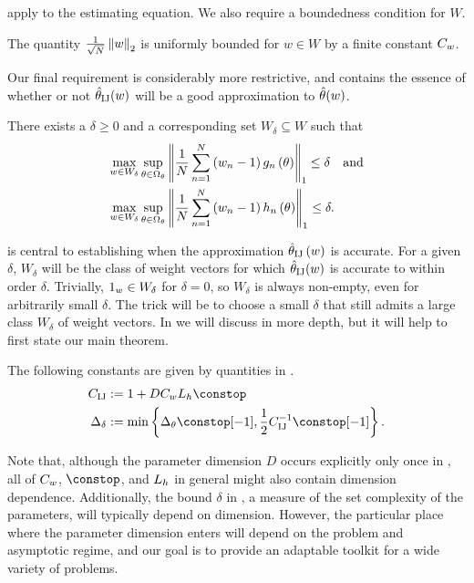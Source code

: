 \coreassum apply to the estimating equation.  We also require
a boundedness condition for $W$.
%
\begin{assumption} \label{assu:paper_weight_bounded}
The quantity
$\frac{1}{\sqrt{N}}\left\Vert w\right\Vert_{2}$ is uniformly bounded for $w\in W$ by a finite
constant $C_{w}$.
\end{assumption}
%
Our final requirement is considerably more restrictive, and
contains the essence of whether or not $\hat{\theta}_{\textrm{IJ}}(w)$ will be a good approximation
to $\hat{\theta}(w)$.
%
\begin{condition}
\label{cond:paper_uniform_bound}There exists a $\delta\ge0$ and
a corresponding set $W_{\delta}\subseteq W$ such that
%
\begin{align*}
\max_{w\in W_{\delta}}\sup_{
    \theta\in\Omega_{\theta}} &\left\Vert \frac{1}{N}\sum_{n=1}^{N}
    \left(w_{n}-1\right)g_{n}\left(\theta\right)\right\Vert_{1}  \le\delta
\quad\textrm{and} \\
\max_{w\in W_{\delta}}\sup_{
    \theta\in\Omega_{\theta}} &\left\Vert \frac{1}{N}\sum_{n=1}^{N}
    \left(w_{n}-1\right)h_{n}\left(\theta\right)\right\Vert_{1}  \le\delta.
\end{align*}
\end{condition}
%
 is central to establishing when the approximation
$\hat{\theta}_{\textrm{IJ}}\left(w\right)$ is accurate. For a given $\delta$, $W_{\delta}$ will be
the class of weight vectors for which $\hat{\theta}_{\textrm{IJ}}(w)$ is accurate to within order
$\delta$. Trivially, $1_{w}\in W_{\delta}$ for $\delta=0$, so $W_{\delta}$ is
always non-empty, even for arbitrarily small $\delta$. The trick will be to
choose a small $\delta$ that still admits a large class $W_{\delta}$ of weight
vectors. In  we will discuss
 in more depth, but it will help to first state our
main theorem.
%
\begin{defn}
\label{defref:constants_definition}  The following constants are given by
quantities in \paperallcoreassum.
\begin{align*}
    \constij &:= 1+D \constw \liph \constop \\
    \deltasize &:=
        \min\left\{ \thetasize\constop[-1],
                    \frac{1}{2}\constij^{-1}\constop[-1]\right\}.
\end{align*}
\end{defn}
%
Note that, although the parameter dimension $D$ occurs explicitly only once in
, all of $C_{w}$, $\constop$, and $L_{h}$ in
general might also contain dimension dependence. Additionally, the bound
$\delta$ in , a measure of the set complexity of
the parameters, will typically depend on dimension. However, the particular
place where the parameter dimension enters will depend on the problem and
asymptotic regime, and our goal is to provide an adaptable toolkit for a wide
variety of problems.

